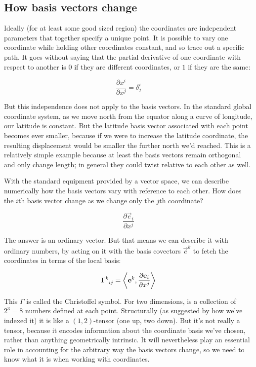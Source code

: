 \subsection{How basis vectors change}

Ideally (for at least some good sized region) the coordinates are independent parameters that together specify a unique point. It is possible to vary one coordinate while holding other coordinates constant, and so trace out a specific path. It goes without saying that the partial derivative of one coordinate with respect to another is $0$ if they are different coordinates, or $1$ if they are the same:

$$
\frac{\partial x^i}{\partial x^j} = \delta^i_j
$$

But this independence does not apply to the basis vectors. In the standard global coordinate system, as we move north from the equator along a curve of longitude, our latitude is constant. But the latitude basis vector associated with each point becomes ever smaller, because if we were to increase the latitude coordinate, the resulting displacement would be smaller the further north we'd reached. This is a relatively simple example because at least the basis vectors remain orthogonal and only change length; in general they could twist relative to each other as well.

With the standard equipment provided by a vector space, we can describe numerically how the basis vectors vary with reference to each other. How does the $i$th basis vector change as we change only the $j$th coordinate?

$$
\frac{\partial \vec{e}_i}{\partial x^j}
$$

The answer is an ordinary vector. But that means we can describe it with ordinary numbers, by acting on it with the basis covectors $\vec{e}^k$ to fetch the coordinates in terms of the local basis:

$$
\Gamma\indices{^k_i_j} = \biggl< \vec{e}^k , \frac{\partial \vec{e}_i}{\partial x^j} \biggr>
$$

This $\Gamma$ is called the Christoffel symbol. For two dimensions, is a collection of $2^3 = 8$ numbers defined at each point. Structurally (as suggested by how we've indexed it) it is like a $(1, 2)$-tensor (one up, two down). But it's not really a tensor, because it encodes information about the coordinate basis we've chosen, rather than anything geometrically intrinsic. It will nevertheless play an essential role in accounting for the arbitrary way the basis vectors change, so we need to know what it is when working with coordinates.

